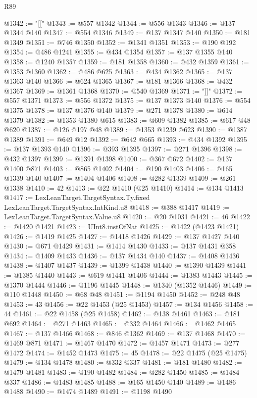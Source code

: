 \begin{lexlean}{R89}
\begin{coremodule}
@1342 := "[["
@1343 := @557 @1342
@1344 := @556 @1343
@1346 := @137 @1344 @140
@1347 := @554 @1346
@1349 := @137 @1347 @140
@1350 := @181 @1349
@1351 := @746 @1350
@1352 := @1341 @1351
@1353 := @190 @192
@1354 := @486 @1241
@1355 := @434 @1354
@1357 := @137 @1355 @140
@1358 := @1240 @1357
@1359 := @181 @1358
@1360 := @432 @1359
@1361 := @1353 @1360
@1362 := @486 @625
@1363 := @434 @1362
@1365 := @137 @1363 @140
@1366 := @624 @1365
@1367 := @181 @1366
@1368 := @432 @1367
@1369 := @1361 @1368
@1370 := @540 @1369
@1371 := "]]"
@1372 := @557 @1371
@1373 := @556 @1372
@1375 := @137 @1373 @140
@1376 := @554 @1375
@1378 := @137 @1376 @140
@1379 := @271 @1378
@1380 := @614 @1379
@1382 := @1353 @1380 @615
@1383 := @609 @1382
@1385 := @617 @48 @620
@1387 := @126 @197 @48
@1389 := @1353 @1239 @623
@1390 := @1387 @1389
@1391 := @649 @12
@1392 := @642 @665
@1393 := @434 @1392
@1395 := @137 @1393 @140
@1396 := @393 @1395
@1397 := @271 @1396
@1398 := @432 @1397
@1399 := @1391 @1398
@1400 := @367 @672
@1402 := @137 @1400 @871
@1403 := @865 @1402
@1404 := @190 @1403
@1406 := @165 @1339 @140
@1407 := @1404 @1406
@1408 := @282 @1339
@1409 := @261 @1338
@1410 := 42
@1413 := @22 @1410 (@25 @1410)
@1414 := @134 @1413
@1417 := LexLeanTarget.TargetSyntax.Ty.fixed LexLeanTarget.TargetSyntax.IntKind.u8
@1418 := @388 @1417
@1419 := LexLeanTarget.TargetSyntax.Value.u8
@1420 := @20 @1031
@1421 := 46
@1422 := @1420 @1421
@1423 := UInt8.instOfNat
@1425 := @1422 (@1423 @1421)
@1426 := @1419 @1425
@1427 := @1418 @1426
@1429 := @137 @1427 @140
@1430 := @671 @1429
@1431 := @1414 @1430
@1433 := @137 @1431 @358
@1434 := @1409 @1433
@1436 := @137 @1434 @140
@1437 := @1408 @1436
@1438 := @1407 @1437
@1439 := @1399 @1438
@1440 := @1390 @1439
@1441 := @1385 @1440
@1443 := @619 @1441 @1406
@1444 := @1383 @1443
@1445 := @1370 @1444
@1446 := @1196 @1445
@1448 := @1340 (@1352 @1446)
@1449 := @110 @1448
@1450 := @68 @48
@1451 := @1194 @1450
@1452 := @248 @48
@1453 := 43
@1456 := @22 @1453 (@25 @1453)
@1457 := @134 @1456
@1458 := 44
@1461 := @22 @1458 (@25 @1458)
@1462 := @138 @1461
@1463 := @181 @692
@1464 := @271 @1463
@1465 := @332 @1464
@1466 := @1462 @1465
@1467 := @137 @1466
@1468 := @846 @1362
@1469 := @137 @1468
@1470 := @1469 @871
@1471 := @1467 @1470
@1472 := @1457 @1471
@1473 := @277 @1472
@1474 := @1452 @1473
@1475 := 45
@1478 := @22 @1475 (@25 @1475)
@1479 := @134 @1478
@1480 := @332 @337
@1481 := @181 @1480
@1482 := @1479 @1481
@1483 := @190 @1482
@1484 := @282 @1450
@1485 := @1484 @337
@1486 := @1483 @1485
@1488 := @165 @1450 @140
@1489 := @1486 @1488
@1490 := @1474 @1489
@1491 := @1198 @1490

\end{coremodule}
\end{lexlean}
